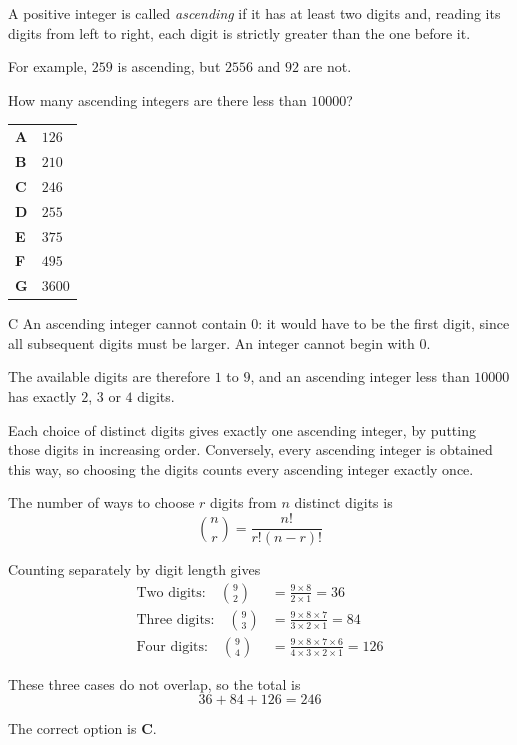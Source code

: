 \documentclass[11pt,a4paper]{article}
\begin{document}
\begin{enumerate}[label=\textbf{\arabic*.},leftmargin=*,itemsep=0pt,start=15]
A positive integer is called \emph{ascending} if it has at least two digits and, reading its digits from left to right, each digit is strictly greater than the one before it. 

For example, $259$ is ascending, but $2556$ and $92$ are not.

How many ascending integers are there less than $10000$?

\par\vspace*{12pt}
\begin{tabularx}{\linewidth}{@{}>{\bfseries}l Y@{}}
A &
$126$
\\[0.8em]
B &
$210$
\\[0.8em]
C &
$246$
\\[0.8em]
D &
$255$
\\[0.8em]
E &
$375$
\\[0.8em]
F &
$495$
\\[0.8em]
G &
$3600$
\\
\end{tabularx}

\begin{djsSolution}{C}
An ascending integer cannot contain $0$: it would have to be the first digit, since all subsequent digits must be larger. An integer cannot begin with $0$.

The available digits are therefore $1$ to $9$, and an ascending integer less than $10000$ has exactly $2$, $3$ or $4$ digits.

Each choice of distinct digits gives exactly one ascending integer, by putting those digits in increasing order. Conversely, every ascending integer is obtained this way, so choosing the digits counts every ascending integer exactly once.

The number of ways to choose $r$ digits from $n$ distinct digits is
\[
\binom{n}{r}=\frac{n!}{r!(n-r)!}
\]

Counting separately by digit length gives
\[
\begin{aligned}
\text{Two digits:}\quad \binom{9}{2}&=\frac{9\times8}{2\times1}=36\\[8pt]
\text{Three digits:}\quad \binom{9}{3}&=\frac{9\times8\times7}{3\times2\times1}=84\\[8pt]
\text{Four digits:}\quad \binom{9}{4}&=\frac{9\times8\times7\times6}{4\times3\times2\times1}=126
\end{aligned}
\]

These three cases do not overlap, so the total is
\[
36+84+126=\boxed{246}
\]

The correct option is \textbf{C}.
\end{djsSolution}
\end{enumerate}
\end{document}

